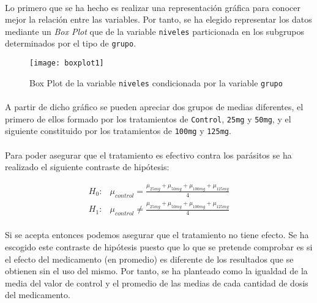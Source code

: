 \documentclass{article}
\begin{document}
      \paragraph{}
      Lo primero que se ha hecho es realizar una representación gráfica para conocer mejor la relación entre las variables. Por tanto, se ha elegido representar los datos mediante un \emph{Box Plot} que de la variable \texttt{niveles} particionada en los subgrupos determinados por el tipo de \texttt{grupo}.

      \begin{figure}[H]
        \centering
        \texttt{[image: boxplot1]}
        \caption{Box Plot de la variable \texttt{niveles} condicionada por la variable \texttt{grupo}}
        \label{fig:figura_1}
      \end{figure}
      \paragraph{}

      \paragraph{}
      A partir de dicho gráfico se pueden apreciar dos grupos de medias diferentes, el primero de ellos formado por los tratamientos de \texttt{Control}, \texttt{25mg} y \texttt{50mg}, y el siguiente constituido por los tratamientos de \texttt{100mg} y \texttt{125mg}.

      \paragraph{}
      Para poder asegurar que el tratamiento es efectivo contra los parásitos se ha realizado el siguiente contraste de hipótesis:

      \begin{align}
        H_0:& \mu_{control} = \frac{\mu_{25mg} + \mu_{50mg} +\mu_{100mg} +\mu_{125mg}}{4} \\
        H_1:& \mu_{control} \neq \frac{\mu_{25mg} + \mu_{50mg} +\mu_{100mg} +\mu_{125mg}}{4}
      \end{align}

      \paragraph{}
      Si se acepta entonces podemos asegurar que el tratamiento no tiene efecto. Se ha escogido este contraste de hipótesis puesto que lo que se pretende comprobar es si el efecto del medicamento (en promedio) es diferente de los resultados que se obtienen sin el uso del mismo. Por tanto, se ha planteado como la igualdad de la media del valor de control y el promedio de las medias de cada cantidad de dosis del medicamento.
\end{document}

